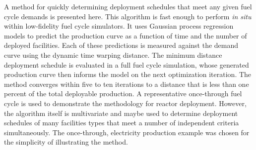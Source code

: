 A method for quickly determining deployment schedules that meet any given
fuel cycle demands is presented here. This algorithm is fast enough to
perform \emph{in situ} within low-fidelity fuel cycle simulators. It uses
Gaussian process regression models to predict the production curve as a
function of time and the number of deployed facilities. Each of these
predictions is measured against the demand curve using the dynamic time
warping distance. The minimum distance deployment schedule is evaluated
in a full fuel cycle simulation, whose generated production curve
then informs the model on the next optimization iteration. The method
converges within five to ten iterations to a distance that is less than one
percent of the total deployable production. A representative once-through
fuel cycle is used to demonstrate the methodology for reactor deployment.
However, the algorithm itself is multivariate and maybe used to determine
deployment schedules of many facilities types that meet a number of
independent criteria simultaneously. The once-through, electricity production
example was chosen for the simplicity of illustrating the method.
